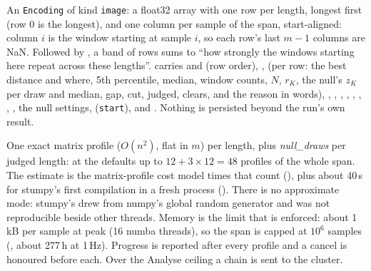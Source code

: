 An \texttt{Encoding} of kind \texttt{image}: a float32 array with one row per length, longest first
(row 0 is the longest), and one column per sample of the span, start-aligned: column $i$ is the
window starting at sample $i$, so each row's last $m - 1$ columns are NaN. Followed by
, a band of rows sums to ``how strongly the windows starting
here repeat across these lengths''.  carries  and
 (row order), ,  (per row: the
best distance and where, 5th percentile, median, window counts, $N$, $r_K$, the null's $z_K$ per
draw and median, gap, cut, judged, clears, and the reason in words), ,
, , , ,
, , , the null settings, 
(\texttt{start}),  and . Nothing is persisted beyond the run's own
result.

One exact matrix profile ($O(n^2)$, flat in $m$) per length, plus \emph{null\_draws} per judged
length: at the defaults up to $12 + 3\times 12 = 48$ profiles of the whole span. The estimate is the
matrix-profile cost model times that count (), plus about 40\,s for stumpy's
first compilation in a fresh process (). There is no approximate mode: stumpy's
 drew from numpy's global random generator and was not reproducible beside other
threads. Memory is the limit that is enforced: about 1\,kB per sample at peak (16 numba threads),
so the span is capped at $10^6$ samples (, about 277\,h at 1\,Hz). Progress
is reported after every profile and a cancel is honoured before each. Over the Analyse ceiling a
chain is sent to the cluster.

